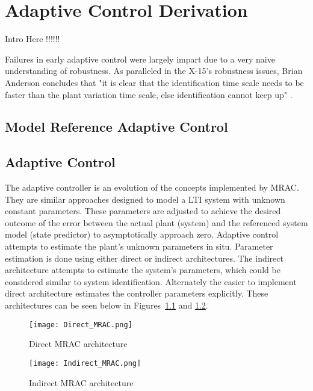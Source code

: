 \chapter{Adaptive Control Derivation}\label{ch:derivation}
Intro Here !!!!!! 

Failures in early adaptive control were largely impart due to a very naive understanding of robustness.  As paralleled in the X-15's robustness issues, Brian Anderson concludes that "it is clear that the identification time scale needs to be faster than the plant variation time scale, else identification cannot keep up" \cite{anderson2005failures}.  

\section{Model Reference Adaptive Control}



\section{\Lone Adaptive Control}
The \Lone adaptive controller is an evolution of the concepts implemented by \ac{MRAC}.  They are similar approaches designed to model a \ac{LTI} system with unknown constant parameters.  These parameters are adjusted to achieve the desired outcome of the error between the actual plant (system) and the referenced system model (state predictor) to asymptotically approach zero.   Adaptive control attempts to estimate the plant's unknown parameters in situ.  Parameter estimation is done using either direct or indirect architectures.  The indirect architecture attempts to estimate the system's parameters, which could be considered similar to  system identification.  Alternately the easier to implement direct architecture estimates the controller parameters explicitly.  These architectures can be seen below in Figures~\ref{fig:direct_mrac} and \ref{fig:indirect_mrac}.

\begin{figure}[h!]
 \centering
  \texttt{[image: Direct\_MRAC.png]}
  \caption{Direct \ac{MRAC} architecture }
  \label{fig:direct_mrac}
\end{figure}

\begin{figure}[h!]
 \centering
  \texttt{[image: Indirect\_MRAC.png]}
  \caption{Indirect \ac{MRAC} architecture }
  \label{fig:indirect_mrac}
\end{figure}

